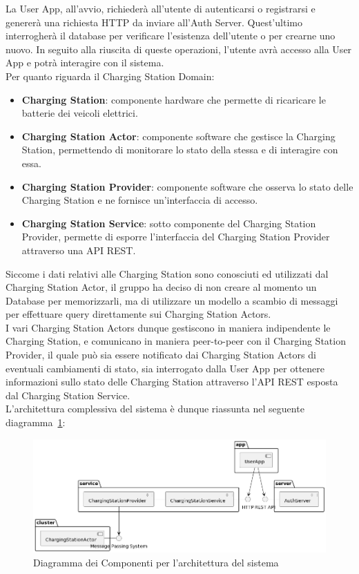 La User App, all'avvio, richiederà all'utente di autenticarsi o registrarsi e genererà una richiesta
HTTP da inviare all'Auth Server. Quest'ultimo interrogherà il database per verificare l'esistenza
dell'utente o per crearne uno nuovo. In seguito alla riuscita di queste operazioni, l'utente avrà
accesso alla User App e potrà interagire con il sistema.\\

Per quanto riguarda il Charging Station Domain:
\begin{itemize}
    \item \textbf{Charging Station}: componente hardware che permette di ricaricare le batterie
          dei veicoli elettrici.
    \item \textbf{Charging Station Actor}: componente software che gestisce la Charging Station,
          permettendo di monitorare lo stato della stessa e di interagire con essa.
    \item \textbf{Charging Station Provider}: componente software che osserva lo stato delle
          Charging Station e ne fornisce un'interfaccia di accesso.
    \item \textbf{Charging Station Service}: sotto componente del Charging Station Provider,
          permette di esporre l'interfaccia del Charging Station Provider attraverso una API REST. \\
\end{itemize}

Siccome i dati relativi alle Charging Station sono conosciuti ed utilizzati dal Charging Station Actor,
il gruppo ha deciso di non creare al momento un Database per memorizzarli, ma di utilizzare un modello
a scambio di messaggi per effettuare query direttamente sui Charging Station Actors.\\

I vari Charging Station Actors dunque gestiscono in maniera indipendente le Charging Station,
e comunicano in maniera peer-to-peer con il Charging Station Provider, il quale può sia essere notificato
dai Charging Station Actors di eventuali cambiamenti di stato, sia interrogato dalla User App
per ottenere informazioni sullo stato delle Charging Station attraverso l'API REST esposta dal
Charging Station Service.\\

L'architettura complessiva del sistema è dunque riassunta nel seguente diagramma \ref{fig:architecture}:

\begin{figure}[htbp]
    \centering
    \includegraphics[width=\textwidth]{images/architecture.png}
    \caption{Diagramma dei Componenti per l'architettura del sistema}
    \label{fig:architecture}
\end{figure}

